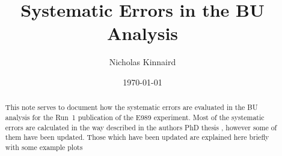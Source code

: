 \documentclass[12pt,letterpaper]{article}
\title{Systematic Errors in the BU Analysis}
\author{Nicholas Kinnaird}
\date{\today}
\begin{document}
\maketitle

\begin{abstract}
	This note serves to document how the systematic errors are evaluated in the BU analysis for the Run~1 publication of the E989 experiment. Most of the systematic errors are calculated in the way described in the authors PhD thesis \cite{phdthesis:2020Kinnaird}, however some of them have been updated. Those which have been updated are explained here briefly with some example plots
\end{abstract}













\printbibliography

\end{document}
